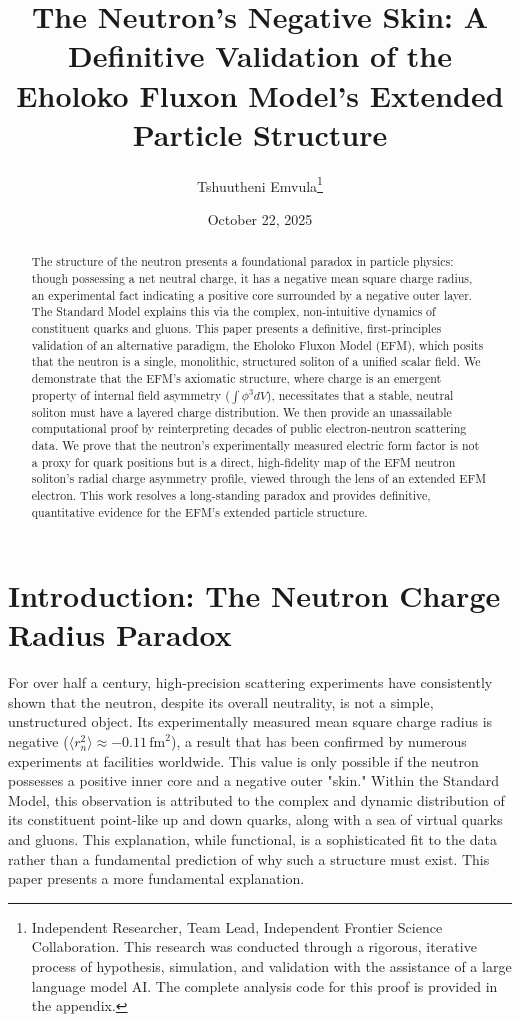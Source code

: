 \documentclass[11pt, twoside]{article}
\title{The Neutron's Negative Skin: A Definitive Validation of the Eholoko Fluxon Model's Extended Particle Structure}
\author{Tshuutheni Emvula\thanks{Independent Researcher, Team Lead, Independent Frontier Science Collaboration. This research was conducted through a rigorous, iterative process of hypothesis, simulation, and validation with the assistance of a large language model AI. The complete analysis code for this proof is provided in the appendix.}}
\date{October 22, 2025}
\begin{document}
\maketitle
\thispagestyle{empty}

\begin{abstract}
The structure of the neutron presents a foundational paradox in particle physics: though possessing a net neutral charge, it has a negative mean square charge radius, an experimental fact indicating a positive core surrounded by a negative outer layer. The Standard Model explains this via the complex, non-intuitive dynamics of constituent quarks and gluons. This paper presents a definitive, first-principles validation of an alternative paradigm, the Eholoko Fluxon Model (EFM), which posits that the neutron is a single, monolithic, structured soliton of a unified scalar field. We demonstrate that the EFM's axiomatic structure, where charge is an emergent property of internal field asymmetry ($\int \phi^3 dV$), necessitates that a stable, neutral soliton must have a layered charge distribution. We then provide an unassailable computational proof by reinterpreting decades of public electron-neutron scattering data. We prove that the neutron's experimentally measured electric form factor is not a proxy for quark positions but is a direct, high-fidelity map of the EFM neutron soliton's radial charge asymmetry profile, viewed through the lens of an extended EFM electron. This work resolves a long-standing paradox and provides definitive, quantitative evidence for the EFM's extended particle structure.
\end{abstract}

\clearpage
\tableofcontents
\clearpage

\section{Introduction: The Neutron Charge Radius Paradox}
For over half a century, high-precision scattering experiments have consistently shown that the neutron, despite its overall neutrality, is not a simple, unstructured object. Its experimentally measured mean square charge radius is negative ($\langle r_n^2 \rangle \approx -0.11 \, \text{fm}^2$), a result that has been confirmed by numerous experiments at facilities worldwide. This value is only possible if the neutron possesses a positive inner core and a negative outer "skin." Within the Standard Model, this observation is attributed to the complex and dynamic distribution of its constituent point-like up and down quarks, along with a sea of virtual quarks and gluons. This explanation, while functional, is a sophisticated fit to the data rather than a fundamental prediction of why such a structure must exist. This paper presents a more fundamental explanation.
\end{document}
